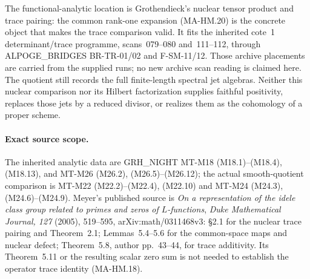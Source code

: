 The functional-analytic location is Grothendieck's
nuclear tensor product and trace pairing: the common
rank-one expansion (MA-HM.20) is the concrete object
that makes the trace comparison valid.  It fits
the inherited cote~1 determinant/trace programme,
scans~079--080 and~111--112, through ALPOGE\_BRIDGES
BR-TR-01/02 and F-SM-11/12.  Those archive placements
are carried from the supplied runs; no new archive
scan reading is claimed here.  The quotient still
records the full finite-length spectral jet algebras.
Neither this nuclear comparison nor its Hilbert
factorization supplies faithful positivity, replaces
those jets by a reduced divisor, or realizes them
as the cohomology of a proper scheme.

\paragraph{Exact source scope.}
The inherited analytic data are GRH\_NIGHT MT-M18
(M18.1)--(M18.4), (M18.13), and MT-M26
(M26.2), (M26.5)--(M26.12); the actual smooth-quotient
comparison is MT-M22 (M22.2)--(M22.4), (M22.10) and
MT-M24 (M24.3), (M24.6)--(M24.9).
Meyer's published source is
\emph{On a representation of the idele class group related
to primes and zeros of $L$-functions},
\emph{Duke Mathematical Journal, 127} (2005), 519--595,
arXiv:math/0311468v3: \S2.1 for the nuclear trace
pairing and Theorem~2.1; Lemmas~5.4--5.6 for the
common-space maps and nuclear defect; Theorem~5.8,
author pp.~43--44, for trace additivity.
Its Theorem~5.11 or the resulting scalar zero sum
is not needed to establish the operator trace
identity (MA-HM.18).
